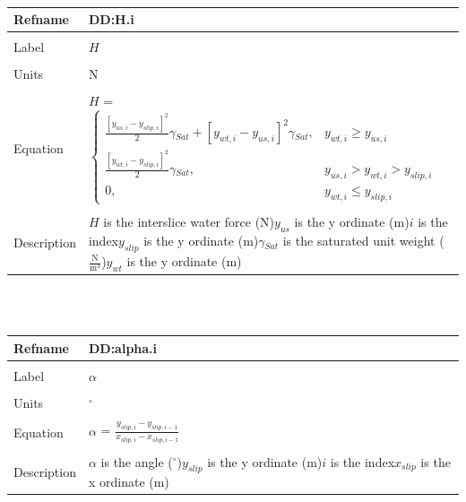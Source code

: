 \documentclass[12pt]{article}
\begin{document}
~\newline
\noindent \begin{minipage}{\textwidth}
\begin{tabular}{p{} p{}}
\toprule \textbf{Refname} & \textbf{DD:H.i}
\label{DD:H.i}
\\ \midrule \\
Label & $H$
\\ \midrule \\
Units & N
\\ \midrule \\
Equation & $H$ = $\begin{cases}
\frac{\left[y_{us,i}-y_{slip,i}\right]^{2}}{2}\gamma{}_{Sat}+\left[y_{wt,i}-y_{us,i}\right]^{2}\gamma{}_{Sat}, & y_{wt,i}\geq{}y_{us,i}\\
\frac{\left[y_{wt,i}-y_{slip,i}\right]^{2}}{2}\gamma{}_{Sat}, & y_{us,i}>y_{wt,i}>y_{slip,i}\\
0, & y_{wt,i}\leq{}y_{slip,i}
\end{cases}$
\\ \midrule \\
Description & $H$ is the interslice water force (N)\newline$y_{us}$ is the y ordinate (m)\newline$i$ is the index\newline$y_{slip}$ is the y ordinate (m)\newline$\gamma{}_{Sat}$ is the saturated unit weight ($\frac{\text{N}}{\text{m}^{3}}$)\newline$y_{wt}$ is the y ordinate (m)
\\ \bottomrule \end{tabular}
\end{minipage}\\
~\newline
\noindent \begin{minipage}{\textwidth}
\begin{tabular}{p{} p{}}
\toprule \textbf{Refname} & \textbf{DD:alpha.i}
\label{DD:alpha.i}
\\ \midrule \\
Label & $\alpha{}$
\\ \midrule \\
Units & ${}^{\circ}$
\\ \midrule \\
Equation & $\alpha{}$ = $\frac{y_{slip,i}-y_{slip,i-1}}{x_{slip,i}-x_{slip,i-1}}$
\\ \midrule \\
Description & $\alpha{}$ is the angle (${}^{\circ}$)\newline$y_{slip}$ is the y ordinate (m)\newline$i$ is the index\newline$x_{slip}$ is the x ordinate (m)
\\ \bottomrule \end{tabular}
\end{minipage}\\
\end{document}
